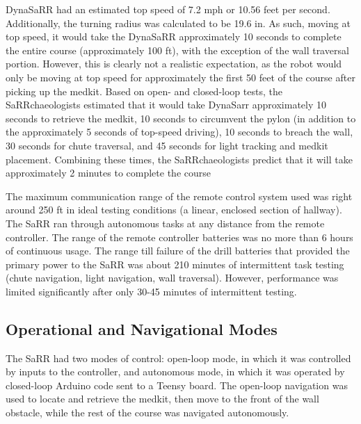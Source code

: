 DynaSaRR had an estimated top speed of 7.2 mph or 10.56 feet per second. Additionally, the turning radius was calculated to be 19.6 in. As such, moving at top speed, it would take the DynaSaRR approximately 10 seconds to complete the entire course (approximately 100 ft), with the exception of the wall traversal portion. However, this is clearly not a realistic expectation, as the robot would only be moving at top speed for approximately the first 50 feet of the course after picking up the medkit. Based on open- and closed-loop tests, the SaRRchaeologists estimated that it would take DynaSarr approximately 10 seconds to retrieve the medkit, 10 seconds to circumvent the pylon (in addition to the approximately 5 seconds of top-speed driving), 10 seconds to breach the wall, 30 seconds for chute traversal, and 45 seconds for light tracking and medkit placement. Combining these times, the SaRRchaeologists predict that it will take approximately 2 minutes to complete the course

The maximum communication range of the remote control system used was right around 250 ft in ideal testing conditions (a linear, enclosed section of hallway). The SaRR ran through autonomous tasks at any distance from the remote controller. The range of the remote controller batteries was no more than 6 hours of continuous usage. The range till failure of the drill batteries that provided the primary power to the SaRR was about 210 minutes of intermittent task testing (chute navigation, light navigation, wall traversal). However, performance was limited significantly after only 30-45 minutes of intermittent testing. 



\subsection{Operational and Navigational Modes}
The SaRR had two modes of control: open-loop mode, in which it was controlled by inputs to the controller, and autonomous mode, in which it was operated by closed-loop Arduino code sent to a Teensy board. The open-loop navigation was used to locate and retrieve the medkit, then move to the front of the wall obstacle, while the rest of the course was navigated autonomously.

